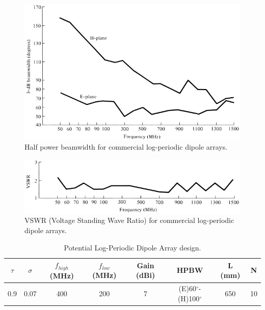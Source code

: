 \begin{figure}[ht]
\centering
    \captionsetup{width=0.8\textwidth}
        \centering
        \includegraphics[width=1\textwidth]{figures/Yannis/HPBW_Log.jpg}
        \caption{Half power beamwidth for commercial log-periodic dipole arrays. \cite{balanis}}
        \label{hpbw_log}
\end{figure}
\begin{figure}[ht]
\centering
        \captionsetup{width=0.8\textwidth}
        \centering
        \includegraphics[width=1\linewidth]{figures/Yannis/VSWR_log.jpg}
        \caption{VSWR (Voltage Standing Wave Ratio) for commercial log-periodic dipole arrays. \cite{balanis}}
        \label{vswr_lpda}
\end{figure}

\begin{table}[H]
\begin{tabular}{| c | c | c | c | c | c | c | c |}
\hline
 $\tau$ & $\sigma$ & $f_{high}$ (MHz) & $f_{low}$ (MHz) & Gain (dBi) & HPBW & L (mm) & N \\ 
 \hline
 0.9 & 0.07 & 400 & 200 & 7 & (E)60$^\circ$-(H)100$^\circ$ & 650 & 10 \\
 \hline
\end{tabular}
\caption{Potential Log-Periodic Dipole Array design.}
\label{table: LPDA}
\end{table}

